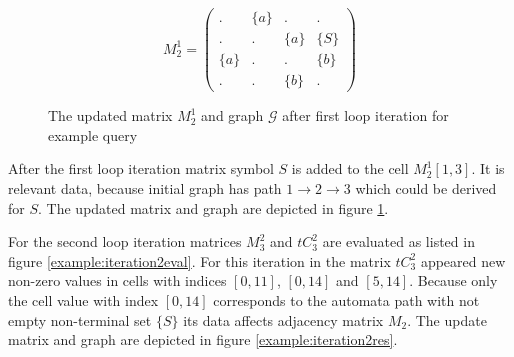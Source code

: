 \begin{figure}[h]
    \begin{subfigure}[]{0.5\textwidth}
    \centering
    $$
    M_2^1 =
    \begin{pmatrix}
    . & \{a\} & . & .     \\
    . & . & \{a\} & \{S\} \\
    \{a\} & . & . & \{b\} \\
    . & . & \{b\} & . 
    \end{pmatrix}
    $$
    \end{subfigure}
    \begin{subfigure}[]{0.4\textwidth}
    \centering
    \end{subfigure}
    \caption{The updated matrix $M_2^1$ and graph $\mathcal{G}$ after first loop iteration for example query}
    \label{example:iteration1res}
\end{figure}

After the first loop iteration matrix symbol $S$ is added to the cell $M_2^1[1,3]$. It is relevant data, because initial graph has path $1 \to 2 \to 3$ which could be derived for $S$. The updated matrix and graph are depicted in figure \ref{example:iteration1res}.

For the second loop iteration matrices $M_3^2$ and $tC_3^2$ are evaluated as listed in figure \ref{example:iteration2eval}. For this iteration in the matrix $tC_3^2$ appeared new non-zero values in cells with indices $[0,11]$, $[0,14]$ and $[5,14]$. Because only the cell value with index $[0,14]$ corresponds to the automata path with not empty non-terminal set $\{S\}$
its data affects adjacency matrix $M_2$. The update matrix and graph  are depicted in figure \ref{example:iteration2res}. 


